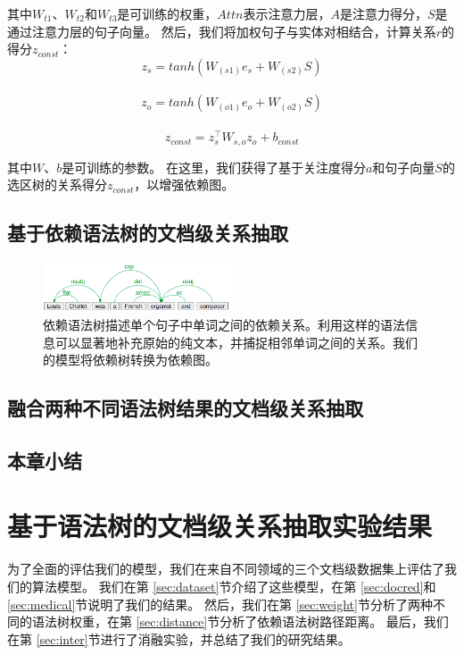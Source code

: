 \documentclass[bachelor]{thesis-uestc}
\begin{document}
其中$W_{t1}、W_{t2}$和$W_{t3}$是可训练的权重，$Attn$表示注意力层，$A$是注意力得分，$S$是通过注意力层的句子向量。
然后，我们将加权句子与实体对相结合，计算关系$r$的得分$z_{const}$：
\begin{equation}
    z_s = tanh(W_{(s1)}e_s+W_{(s2)}S)
\end{equation}
\\
\begin{equation}
    z_o = tanh(W_{(o1)}e_o+W_{(o2)}S)
\end{equation}
\\
\begin{equation}
    z_{const} = z_s^\top W_{s, o}z_o+b_{const}
\end{equation}

其中$W、b$是可训练的参数。
在这里，我们获得了基于关注度得分$a$和句子向量$S$的选区树的关系得分$z_{const}$，以增强依赖图。\par

\section{基于依赖语法树的文档级关系抽取}
\begin{figure}[t]
    \includegraphics[width=0.5\textwidth]{misc/dependency.png}
    \caption{依赖语法树描述单个句子中单词之间的依赖关系。利用这样的语法信息可以显著地补充原始的纯文本，并捕捉相邻单词之间的关系。我们的模型将依赖树转换为依赖图。} 
\end{figure}\label{fig_syn_a}

\section{融合两种不同语法树结果的文档级关系抽取}

\section{本章小结}

\chapter{基于语法树的文档级关系抽取实验结果}
为了全面的评估我们的模型，我们在来自不同领域的三个文档级数据集上评估了我们的算法模型。
我们在第 \ref{sec:dataset}节介绍了这些模型，在第 \ref{sec:docred}和 \ref{sec:medical}节说明了我们的结果。
然后，我们在第 \ref{sec:weight}节分析了两种不同的语法树权重，在第 \ref{sec:distance}节分析了依赖语法树路径距离。
最后，我们在第 \ref{sec:inter}节进行了消融实验，并总结了我们的研究结果。
\end{document}
